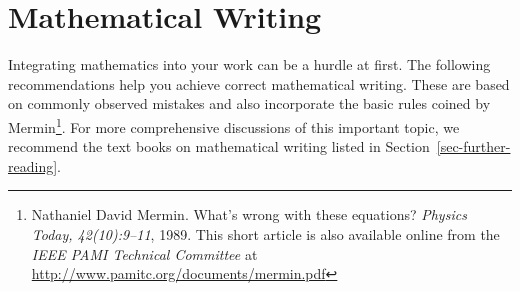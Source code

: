 \documentclass[11pt,a4paper]{article}
\begin{document}
\newpage
\section{Mathematical Writing}
\label{sec-mathematics}
Integrating mathematics into your work can be a hurdle at first.
The following recommendations help you achieve correct mathematical writing.
These are based on commonly observed mistakes and also incorporate the basic rules coined by Mermin\footnote{Nathaniel David Mermin. What's wrong with these equations? \emph{Physics Today, 42(10):9--11}, 1989. This short article is also available online from the \emph{IEEE PAMI Technical Committee} at \url{http://www.pamitc.org/documents/mermin.pdf}}.
For more comprehensive discussions of this important topic, we recommend the text books on mathematical writing listed in Section~\ref{sec-further-reading}.
\end{document}
